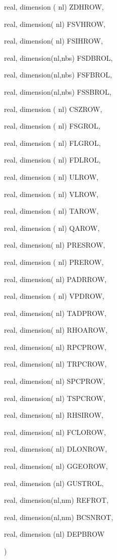 {\begin{DoxyParamCaption}
\item[{real, dimension ( nl)}]{Z\+D\+H\+R\+O\+W, }
\item[{real, dimension( nl)}]{F\+S\+V\+H\+R\+O\+W, }
\item[{real, dimension( nl)}]{F\+S\+I\+H\+R\+O\+W, }
\item[{real, dimension(nl,nbs)}]{F\+S\+D\+B\+R\+O\+L, }
\item[{real, dimension(nl,nbs)}]{F\+S\+F\+B\+R\+O\+L, }
\item[{real, dimension(nl,nbs)}]{F\+S\+S\+B\+R\+O\+L, }
\item[{real, dimension ( nl)}]{C\+S\+Z\+R\+O\+W, }
\item[{real, dimension ( nl)}]{F\+S\+G\+R\+O\+L, }
\item[{real, dimension ( nl)}]{F\+L\+G\+R\+O\+L, }
\item[{real, dimension ( nl)}]{F\+D\+L\+R\+O\+L, }
\item[{real, dimension  ( nl)}]{U\+L\+R\+O\+W, }
\item[{real, dimension  ( nl)}]{V\+L\+R\+O\+W, }
\item[{real, dimension  ( nl)}]{T\+A\+R\+O\+W, }
\item[{real, dimension  ( nl)}]{Q\+A\+R\+O\+W, }
\item[{real, dimension( nl)}]{P\+R\+E\+S\+R\+O\+W, }
\item[{real, dimension ( nl)}]{P\+R\+E\+R\+O\+W, }
\item[{real, dimension( nl)}]{P\+A\+D\+R\+R\+O\+W, }
\item[{real, dimension ( nl)}]{V\+P\+D\+R\+O\+W, }
\item[{real, dimension( nl)}]{T\+A\+D\+P\+R\+O\+W, }
\item[{real, dimension( nl)}]{R\+H\+O\+A\+R\+O\+W, }
\item[{real, dimension( nl)}]{R\+P\+C\+P\+R\+O\+W, }
\item[{real, dimension( nl)}]{T\+R\+P\+C\+R\+O\+W, }
\item[{real, dimension( nl)}]{S\+P\+C\+P\+R\+O\+W, }
\item[{real, dimension( nl)}]{T\+S\+P\+C\+R\+O\+W, }
\item[{real, dimension( nl)}]{R\+H\+S\+I\+R\+O\+W, }
\item[{real, dimension( nl)}]{F\+C\+L\+O\+R\+O\+W, }
\item[{real, dimension( nl)}]{D\+L\+O\+N\+R\+O\+W, }
\item[{real, dimension( nl)}]{G\+G\+E\+O\+R\+O\+W, }
\item[{real, dimension (nl)}]{G\+U\+S\+T\+R\+O\+L, }
\item[{real, dimension(nl,nm)}]{R\+E\+F\+R\+O\+T, }
\item[{real, dimension(nl,nm)}]{B\+C\+S\+N\+R\+O\+T, }
\item[{real, dimension (nl)}]{D\+E\+P\+B\+R\+O\+W}
\end{DoxyParamCaption}
)}\label{CLASSG_8f_ab216eee141d163cce79e9606e2374659}

